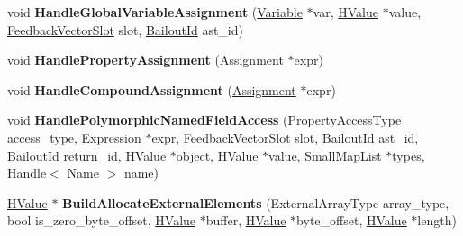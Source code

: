 \begin{DoxyCompactItemize}
\item 
void {\bfseries Handle\+Global\+Variable\+Assignment} (\hyperlink{classv8_1_1internal_1_1_variable}{Variable} $\ast$var, \hyperlink{classv8_1_1internal_1_1_h_value}{H\+Value} $\ast$value, \hyperlink{classv8_1_1internal_1_1_feedback_vector_slot}{Feedback\+Vector\+Slot} slot, \hyperlink{classv8_1_1internal_1_1_bailout_id}{Bailout\+Id} ast\+\_\+id)\hypertarget{classv8_1_1internal_1_1_h_optimized_graph_builder_a0e8a5b571596091f58e496d4c200083b}{}\label{classv8_1_1internal_1_1_h_optimized_graph_builder_a0e8a5b571596091f58e496d4c200083b}

\item 
void {\bfseries Handle\+Property\+Assignment} (\hyperlink{classv8_1_1internal_1_1_assignment}{Assignment} $\ast$expr)\hypertarget{classv8_1_1internal_1_1_h_optimized_graph_builder_aef4d3aab8cfe1e2d3facd1d171168d07}{}\label{classv8_1_1internal_1_1_h_optimized_graph_builder_aef4d3aab8cfe1e2d3facd1d171168d07}

\item 
void {\bfseries Handle\+Compound\+Assignment} (\hyperlink{classv8_1_1internal_1_1_assignment}{Assignment} $\ast$expr)\hypertarget{classv8_1_1internal_1_1_h_optimized_graph_builder_a6e913142689d5b90b16cfb9ff5ea8bc7}{}\label{classv8_1_1internal_1_1_h_optimized_graph_builder_a6e913142689d5b90b16cfb9ff5ea8bc7}

\item 
void {\bfseries Handle\+Polymorphic\+Named\+Field\+Access} (Property\+Access\+Type access\+\_\+type, \hyperlink{classv8_1_1internal_1_1_expression}{Expression} $\ast$expr, \hyperlink{classv8_1_1internal_1_1_feedback_vector_slot}{Feedback\+Vector\+Slot} slot, \hyperlink{classv8_1_1internal_1_1_bailout_id}{Bailout\+Id} ast\+\_\+id, \hyperlink{classv8_1_1internal_1_1_bailout_id}{Bailout\+Id} return\+\_\+id, \hyperlink{classv8_1_1internal_1_1_h_value}{H\+Value} $\ast$object, \hyperlink{classv8_1_1internal_1_1_h_value}{H\+Value} $\ast$value, \hyperlink{classv8_1_1internal_1_1_small_map_list}{Small\+Map\+List} $\ast$types, \hyperlink{classv8_1_1internal_1_1_handle}{Handle}$<$ \hyperlink{classv8_1_1internal_1_1_name}{Name} $>$ name)\hypertarget{classv8_1_1internal_1_1_h_optimized_graph_builder_a7a902e190c10b60efd63fdbc0c739fe6}{}\label{classv8_1_1internal_1_1_h_optimized_graph_builder_a7a902e190c10b60efd63fdbc0c739fe6}

\item 
\hyperlink{classv8_1_1internal_1_1_h_value}{H\+Value} $\ast$ {\bfseries Build\+Allocate\+External\+Elements} (External\+Array\+Type array\+\_\+type, bool is\+\_\+zero\+\_\+byte\+\_\+offset, \hyperlink{classv8_1_1internal_1_1_h_value}{H\+Value} $\ast$buffer, \hyperlink{classv8_1_1internal_1_1_h_value}{H\+Value} $\ast$byte\+\_\+offset, \hyperlink{classv8_1_1internal_1_1_h_value}{H\+Value} $\ast$length)\hypertarget{classv8_1_1internal_1_1_h_optimized_graph_builder_a4faea12b6cab12d9033dab6803336ff1}{}\label{classv8_1_1internal_1_1_h_optimized_graph_builder_a4faea12b6cab12d9033dab6803336ff1}


\end{DoxyCompactItemize}

